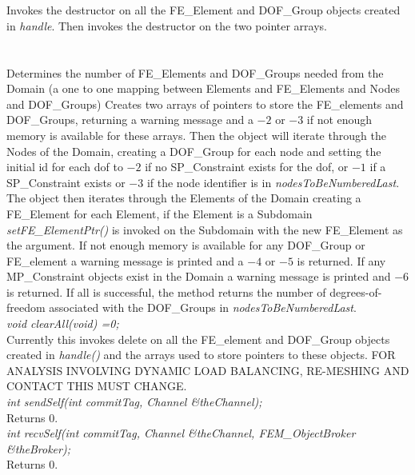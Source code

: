  \\
\\ 
Invokes the destructor on all the FE\_Element and DOF\_Group objects
created in {\em handle}. Then invokes the destructor on the two
pointer arrays. \\

\\
 \\
Determines the number of FE\_Elements and DOF\_Groups needed from the
Domain (a one to one mapping between Elements and FE\_Elements and
Nodes and DOF\_Groups) Creates two arrays of pointers to store the
FE\_elements and DOF\_Groups, returning a warning message and a $-2$
or $-3$ if not enough memory is available for these arrays. Then the
object will iterate through the Nodes of the Domain, creating a
DOF\_Group for each node and setting the initial id for each dof to
$-2$ if no SP\_Constraint exists for the dof, or $-1$ if a
SP\_Constraint exists or $-3$ if the node identifier is in {\em
nodesToBeNumberedLast}. The object then iterates through the Elements
of the Domain creating a FE\_Element for each Element, if the Element
is a Subdomain {\em setFE\_ElementPtr()} is invoked on the Subdomain
with the new FE\_Element as the argument. If not enough memory is
available for any DOF\_Group or FE\_element a warning message is
printed and a $-4$ or $-5$ is returned. If any MP\_Constraint objects
exist in the Domain a warning message is printed and $-6$ is
returned. If all is successful, the method returns the number of
degrees-of-freedom associated with the DOF\_Groups in {\em
nodesToBeNumberedLast}. \\ 

{\em void clearAll(void) =0;} \\
Currently this invokes delete on all the FE\_element and DOF\_Group
objects created in {\em handle()} and the arrays used to store
pointers to these objects. FOR ANALYSIS INVOLVING DYNAMIC LOAD
BALANCING, RE-MESHING AND CONTACT THIS MUST CHANGE. \\

{\em int sendSelf(int commitTag, Channel \&theChannel); } \\
Returns $0$. \\

{\em int recvSelf(int commitTag, Channel \&theChannel, FEM\_ObjectBroker
\&theBroker); } \\
Returns $0$. 